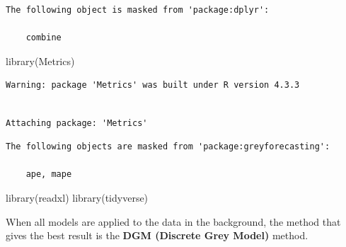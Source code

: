 \documentclass[
  11pt,
  a4paper,
  DIV=11,
  numbers=noendperiod]{scrartcl}
\newenvironment{Shaded}{\begin{snugshade}}{\end{snugshade}}
\newcommand{\FunctionTok}[1]{\textcolor[rgb]{0.28,0.35,0.67}{#1}}
\newcommand{\NormalTok}[1]{\textcolor[rgb]{0.00,0.23,0.31}{#1}}
\begin{document}
\begin{verbatim}
The following object is masked from 'package:dplyr':

    combine
\end{verbatim}

\begin{Shaded}
\begin{Highlighting}[]
\FunctionTok{library}\NormalTok{(Metrics)}
\end{Highlighting}
\end{Shaded}

\begin{verbatim}
Warning: package 'Metrics' was built under R version 4.3.3
\end{verbatim}

\begin{verbatim}

Attaching package: 'Metrics'
\end{verbatim}

\begin{verbatim}
The following objects are masked from 'package:greyforecasting':

    ape, mape
\end{verbatim}

\begin{Shaded}
\begin{Highlighting}[]
\FunctionTok{library}\NormalTok{(readxl)}
\FunctionTok{library}\NormalTok{(tidyverse)}
\end{Highlighting}
\end{Shaded}

When all models are applied to the data in the background, the method
that gives the best result is the \textbf{DGM (Discrete Grey Model)}
method.
\end{document}
